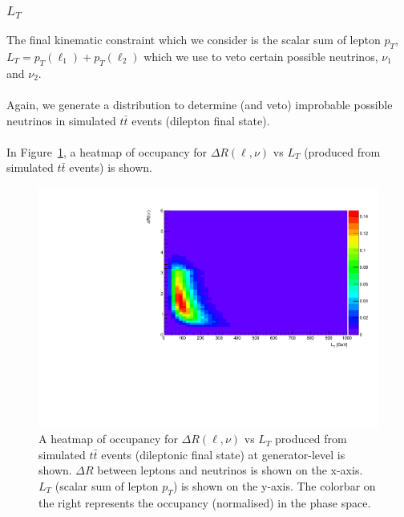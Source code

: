 \subsubsection{$L_{T}$}

The final kinematic constraint which we consider is the scalar sum of lepton $p_{T}$, $L_{T} = p_{T}(\ell_{1}) + p_{T}(\ell_{2})$ which we use to veto certain possible neutrinos, $\nu_{1}$ and $\nu_{2}$.\\\\
Again, we generate a distribution to determine (and veto) improbable possible neutrinos in simulated $t\bar{t}$ events (dilepton final state).\\\\
In Figure~\ref{fig:lt-heatmap}, a heatmap of occupancy for $\Delta R (\ell, \nu)$ vs $L_{T}$ (produced from simulated $t\bar{t}$ events) is shown. 


 \begin{figure}[h!]
	\includegraphics[width=0.7\linewidth]{figures/lt_occ_2vSM.pdf}
	\centering
	\caption{A heatmap of occupancy for $\Delta R (\ell, \nu)$ vs $L_{T}$ produced from simulated $t\bar{t}$ events (dileptonic final state) at generator-level is shown. $\Delta R$ between leptons and neutrinos is shown on the x-axis. $L_{T}$ (scalar sum of lepton $p_{T}$) is shown on the y-axis. The colorbar on the right represents the occupancy (normalised) in the phase space. }
	\label{fig:lt-heatmap}
\end{figure}

